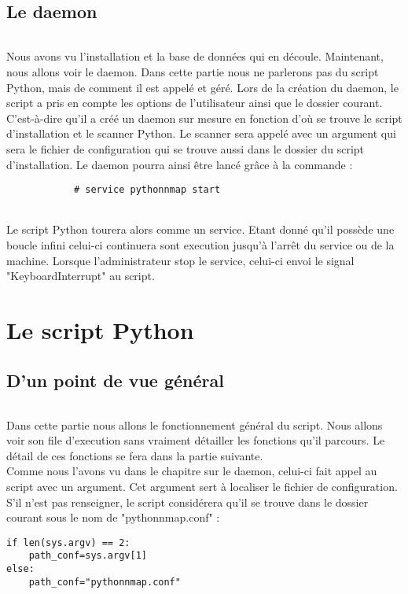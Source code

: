 \documentclass[12pt]{report}
\begin{document}
	\chapter{Le daemon}
		\paragraph{}
			Nous avons vu l'installation et la base de données qui en découle. Maintenant, nous allons voir le daemon. Dans cette partie nous ne parlerons pas du script Python, mais de comment il est appelé et géré. Lors de la création du daemon, le script a pris en compte les options de l'utilisateur ainsi que le dossier courant. C'est-à-dire qu'il a créé un daemon sur mesure en fonction d'où se trouve le script d'installation et le scanner Python. Le scanner sera appelé avec un argument qui sera le fichier de configuration qui se trouve aussi dans le dossier du script d'installation. Le daemon pourra ainsi être lancé grâce à la commande :
			\begin{lstlisting}
			# service pythonnmap start
			\end{lstlisting}
		\paragraph{}
			Le script Python tourera alors comme un service. Etant donné qu'il possède une boucle infini celui-ci continuera sont execution jusqu'à l'arrêt du service ou de la machine. Lorsque l'administrateur stop le service, celui-ci envoi le signal "KeyboardInterrupt" au script.
\part{Le script Python}
	\chapter{D'un point de vue général}
		\paragraph{}
			Dans cette partie nous allons le fonctionnement général du script. Nous allons voir son file d'execution sans vraiment détailler les fonctions qu'il parcours. Le détail de ces fonctions se fera dans la partie suivante.\\
			Comme nous l'avons vu dans le chapitre sur le daemon, celui-ci fait appel au script avec un argument. Cet argument sert à localiser le fichier de configuration. S'il n'est pas renseigner, le script considérera qu'il se trouve dans le dossier courant sous le nom de "pythonnmap.conf" :
			\begin{lstlisting}[caption=Récupération path fichier configuration, captionpos=b]
if len(sys.argv) == 2:
    path_conf=sys.argv[1]
else:
    path_conf="pythonnmap.conf"
			\end{lstlisting}
\end{document}
